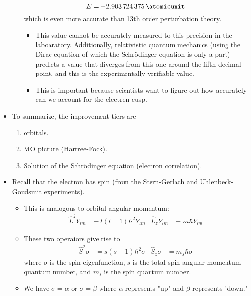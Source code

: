 \documentclass[../notes.tex]{subfiles}
\begin{document}
\begin{itemize}
\begin{itemize}
        \begin{equation*}
            E = \SI{-2.903724375}{\atomicunit}
        \end{equation*}
        which is even more accurate than 13th order perturbation theory.
        \begin{itemize}
            \item This value cannot be accurately measured to this precision in the laboaratory. Additionally, relativistic quantum mechanics (using the Dirac equation of which the Schr\"{o}dinger equation is only a part) predicts a value that diverges from this one around the fifth decimal point, and this is the experimentally verifiable value.
            \item This is important because scientists want to figure out how accurately can we account for the electron cusp.
        \end{itemize}
    \end{itemize}
    \item To summarize, the improvement tiers are
    \begin{enumerate}
        \item {} orbitals.
        \item MO picture (Hartree-Fock).
        \item Solution of the Schr\"{o}dinger equation (electron correlation).
    \end{enumerate}
    \item Recall that the electron has spin (from the Stern-Gerlach and Uhlenbeck-Goudsmit experiments).
    \begin{itemize}
        \item This is analogous to orbital angular momentum:
        \begin{align*}
            \hat{L}^2Y_{lm} &= l(l+1)\hbar^2Y_{lm}&
            \hat{L}_zY_{lm} &= m\hbar Y_{lm}
        \end{align*}
        \item These two operators give rise to
        \begin{align*}
            \hat{S}^2\sigma &= s(s+1)\hbar^2\sigma&
            \hat{S}_z\sigma &= m_s\hbar\sigma
        \end{align*}
        where $\sigma$ is the spin eigenfunction, $s$ is the total spin angular momentum quantum number, and $m_s$ is the spin quantum number.
        \item We have $\sigma=\alpha$ or $\sigma=\beta$ where $\alpha$ represents "up" and $\beta$ represents "down."

\end{itemize}
\end{itemize}
\end{document}
